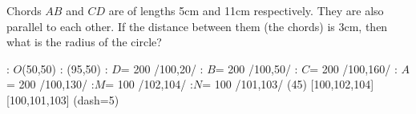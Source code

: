 
%
%
%
%
% 
% 

\question Chords $AB$ and $CD$ are of lengths 5cm and 11cm respectively. They are also 
parallel to each other. If the distance between them (the chords) is 3cm, then what is 
the radius of the circle? 

\insertQR{}

  \begin{marginfigure}
      : $O$(50,50)
      : (95,50) %
      : $D$= 200 /100,20/
      : $B$= 200 /100,50/
      : $C$= 200 /100,160/
      : $A$= 200 /100,130/
      :$M$= 100 /102,104/
      :$N$= 100 /101,103/
    \figdrawbegin{}
      (45)
      \figdrawline [101,103]
      \figdrawline [102,104]
       [100,102,104]
       [100,101,103]
      \ifprintanswers
        \figset (dash=5)
        \figdrawline [100,101]
        \figdrawline [100,102]
      \fi
    \figdrawend
    \centerline{\box\figBoxA}
  \end{marginfigure}

